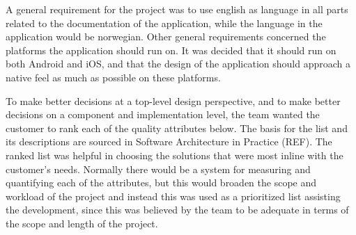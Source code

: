 A general requirement for the project was to use english as language in all parts related to the documentation of the application, while the language in the application would be norwegian. Other general requirements concerned the platforms the application should run on. It was decided that it should run on both Android and iOS, and that the design of the application should approach a native feel as much as possible on these platforms.\newline

To make better decisions at a top-level design perspective, and to make better decisions on a component and implementation level, the team wanted the customer to rank each of the quality attributes below. The basis for the list and its descriptions are sourced in Software Architecture in Practice (REF). The ranked list was helpful in choosing the solutions that were most inline with the customer’s needs. Normally there would be a system for measuring and quantifying each of the attributes, but this would broaden the scope and workload of the project and instead this was used as a prioritized list assisting the development, since this was believed by the team to be adequate in terms of the scope and length of the project.\newline

